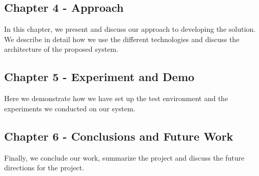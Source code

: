 \subsection{Chapter 4 - Approach}
In this chapter, we present and discuss our approach to developing the solution. We describe in detail how we use the different technologies and discuss the architecture of the proposed system. 

\subsection{Chapter 5 - Experiment and Demo}
Here we demonstrate how we have set up the test environment and the experiments we conducted on our system.

\subsection{Chapter 6 - Conclusions and Future Work}
Finally, we conclude our work, summarize the project and discuss the future directions for the project.